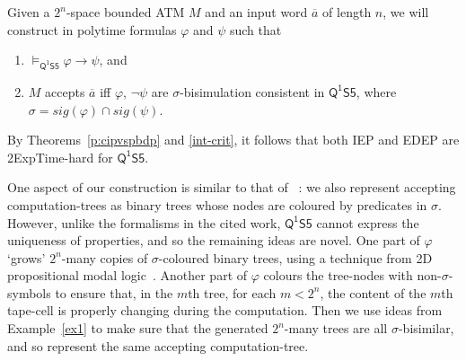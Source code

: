 \documentclass{lmcs} %
\theoremstyle{plain}\newtheorem{satz}[thm]{Satz} %
\newcommand{\nb}[1]{\textcolor{red}{\bf!}%
	\marginpar[\parbox{15mm}{\raggedleft\scriptsize\textcolor{red}{#1}}]%
	{\parbox{15mm}{\raggedright\scriptsize\textcolor{red}{#1}}}}
\newcommand{\sig}{\mathit{sig}}
\newcommand{\FOMS}{\ensuremath{\mathsf{Q^1S5}}}
\newcommand{\inpw}{\overline{a}}
\begin{document}
	Given a $2^n$-space bounded ATM $M$ and an input word $\inpw$ of length $n$, we will 
	construct in polytime formulas  $\varphi$ and $\psi$
	such that 
	\begin{enumerate}
		\item
		$\models_{\FOMS}\varphi\to\psi$, and
		
		\item
		$M$ accepts $\inpw$ iff $\varphi$, $\neg\psi$ are $\sigma$-bisimulation consistent in $\FOMS$,
		where $\sigma=\sig(\varphi)\cap\sig(\psi)$.
	\end{enumerate}
	By Theorems~\ref{p:cipvspbdp} and \ref{int-crit},
	it follows that both IEP and EDEP are {\sc 2ExpTime}-hard for $\FOMS$.
	
	One aspect of our construction is similar to that of ~\cite{DBLP:conf/aaai/ArtaleJMOW21,DBLP:conf/lics/JungW21}: we also represent accepting computation-trees as binary trees whose nodes are coloured by  predicates in $\sigma$. However, unlike the formalisms in the cited work, \FOMS{} cannot express the uniqueness of properties, and so the remaining ideas are novel. 
	One part of $\varphi$ `grows' $2^n$-many copies of $\sigma$-coloured binary trees, using a technique from 2D propositional modal logic~\cite{DBLP:conf/time/HodkinsonKKWZ03,DBLP:journals/tocl/GollerJL15}. Another part of $\varphi$ colours the tree-nodes with non-$\sigma$-symbols to ensure that, in the $m$th tree,  for each $m<2^n$, the content of the $m$th tape-cell is properly changing during the computation. Then we use ideas from Example~\ref{ex1} to make sure that the generated $2^n$-many trees are all $\sigma$-bisimilar, and so represent the same accepting computation-tree. 
	
\end{document}
